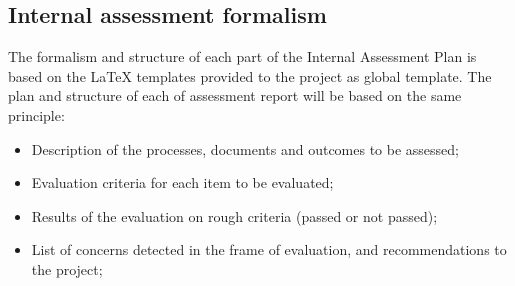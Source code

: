 \documentclass{template/openetcs_article}
\begin{document}
\subsection{Internal assessment formalism}
The formalism and structure of each part of the Internal Assessment Plan is based on the LaTeX templates provided to the project as global template.
The plan and structure of each of assessment report will be based on the same principle:
 \begin{itemize}
\item Description of the processes, documents and outcomes to be assessed;
\item Evaluation criteria for each item to be evaluated;
\item Results of the evaluation on rough criteria (passed or not passed);
\item List of concerns detected in the frame of evaluation, and recommendations to the project;
\end{itemize}







\end{document}

